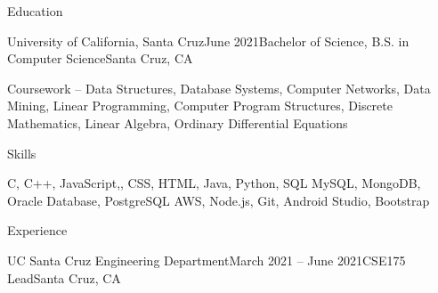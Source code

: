 \documentclass[fit]{cvtemplate}
\begin{document}
\begin{cvtext}


\cvheader


\begin{cvsection}{Education}


  \begin{cvsubsection}
    {University of California, Santa Cruz}{June 2021}{Bachelor of Science, B.S. in Computer Science}{Santa Cruz, CA}

    \listitem Coursework -- Data Structures, Database Systems, Computer
    Networks, Data Mining, Linear  Programming, Computer Program Structures, Discrete Mathematics, Linear Algebra, Ordinary Differential Equations

  \end{cvsubsection}

\end{cvsection}


\begin{cvsection}{Skills}


  \descitem[Languages] C, C++, JavaScript,, CSS, HTML, Java,  Python, SQL
  \descitem[Databases] MySQL, MongoDB, Oracle Database, PostgreSQL
  \descitem[Utilities] AWS, Node.js, Git, Android Studio, Bootstrap

\end{cvsection}


\begin{cvsection}{Experience}


  \begin{cvsubsection}
    {UC Santa Cruz Engineering Department}{March 2021 -- June 2021}{CSE175 Lead}{Santa Cruz, CA}


\end{cvsubsection}
\end{cvsection}
\end{cvtext}
\end{document}

